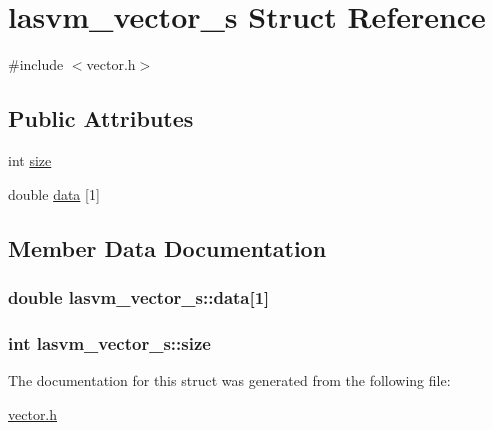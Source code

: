 \hypertarget{structlasvm__vector__s}{\section{lasvm\+\_\+vector\+\_\+s Struct Reference}
\label{structlasvm__vector__s}
}


{\ttfamily \#include $<$vector.\+h$>$}

\subsection*{Public Attributes}
\begin{DoxyCompactItemize}
\item 
int \hyperlink{structlasvm__vector__s_a3ed9f6bfa0a09a84e42ff4f61669e294}{size}
\item 
double \hyperlink{structlasvm__vector__s_a208f1740a7d361ba3cd6afa5eec108c9}{data} \mbox{[}1\mbox{]}
\end{DoxyCompactItemize}


\subsection{Member Data Documentation}
\hypertarget{structlasvm__vector__s_a208f1740a7d361ba3cd6afa5eec108c9}{
\subsubsection[{data}]{\setlength{\rightskip}{0pt plus 5cm}double lasvm\+\_\+vector\+\_\+s\+::data\mbox{[}1\mbox{]}}}\label{structlasvm__vector__s_a208f1740a7d361ba3cd6afa5eec108c9}
\hypertarget{structlasvm__vector__s_a3ed9f6bfa0a09a84e42ff4f61669e294}{
\subsubsection[{size}]{\setlength{\rightskip}{0pt plus 5cm}int lasvm\+\_\+vector\+\_\+s\+::size}}\label{structlasvm__vector__s_a3ed9f6bfa0a09a84e42ff4f61669e294}


The documentation for this struct was generated from the following file\+:\begin{DoxyCompactItemize}
\item 
\hyperlink{vector_8h}{vector.\+h}\end{DoxyCompactItemize}
